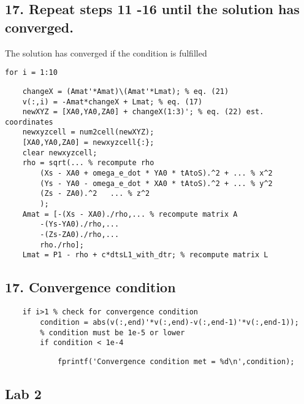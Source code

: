 \subsection*{17. Repeat steps 11 -16 until the solution has converged.}

\begin{par}
The solution has converged if the condition is fulfilled
\end{par} \vspace{1em}
\begin{verbatim}
for i = 1:10
\end{verbatim}
\begin{verbatim}
    changeX = (Amat'*Amat)\(Amat'*Lmat); % eq. (21)
    v(:,i) = -Amat*changeX + Lmat; % eq. (17)
    newXYZ = [XA0,YA0,ZA0] + changeX(1:3)'; % eq. (22) est. coordinates
    newxyzcell = num2cell(newXYZ);
    [XA0,YA0,ZA0] = newxyzcell{:};
    clear newxyzcell;
    rho = sqrt(... % recompute rho
        (Xs - XA0 + omega_e_dot * YA0 * tAtoS).^2 + ... % x^2
        (Ys - YA0 - omega_e_dot * XA0 * tAtoS).^2 + ... % y^2
        (Zs - ZA0).^2   ... % z^2
        );
    Amat = [-(Xs - XA0)./rho,... % recompute matrix A
        -(Ys-YA0)./rho,...
        -(Zs-ZA0)./rho,...
        rho./rho];
    Lmat = P1 - rho + c*dtsL1_with_dtr; % recompute matrix L
\end{verbatim}


\subsection*{17. Convergence condition}

\begin{verbatim}
    if i>1 % check for convergence condition
        condition = abs(v(:,end)'*v(:,end)-v(:,end-1)'*v(:,end-1)); 
		% condition must be 1e-5 or lower
        if condition < 1e-4
\end{verbatim}
\begin{verbatim}
            fprintf('Convergence condition met = %d\n',condition);
\end{verbatim}
\color{black}
    

\subsection*{Lab 2}

